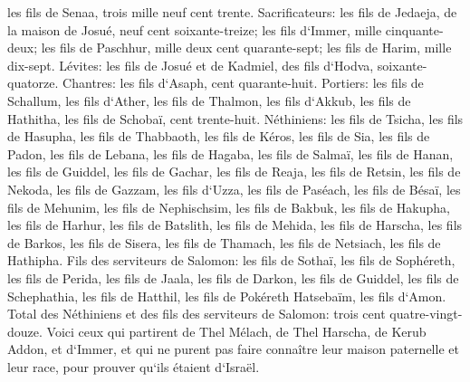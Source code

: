 \verse les fils de Senaa, trois mille neuf cent trente. 
\verse Sacrificateurs: les fils de Jedaeja, de la maison de Josué, neuf cent soixante-treize; 
\verse les fils d`Immer, mille cinquante-deux; 
\verse les fils de Paschhur, mille deux cent quarante-sept; 
\verse les fils de Harim, mille dix-sept. 
\verse Lévites: les fils de Josué et de Kadmiel, des fils d`Hodva, soixante-quatorze. 
\verse Chantres: les fils d`Asaph, cent quarante-huit. 
\verse Portiers: les fils de Schallum, les fils d`Ather, les fils de Thalmon, les fils d`Akkub, les fils de Hathitha, les fils de Schobaï, cent trente-huit. 
\verse Néthiniens: les fils de Tsicha, les fils de Hasupha, les fils de Thabbaoth, 
\verse les fils de Kéros, les fils de Sia, les fils de Padon, 
\verse les fils de Lebana, les fils de Hagaba, les fils de Salmaï, 
\verse les fils de Hanan, les fils de Guiddel, les fils de Gachar, 
\verse les fils de Reaja, les fils de Retsin, les fils de Nekoda, 
\verse les fils de Gazzam, les fils d`Uzza, les fils de Paséach, 
\verse les fils de Bésaï, les fils de Mehunim, les fils de Nephischsim, 
\verse les fils de Bakbuk, les fils de Hakupha, les fils de Harhur, 
\verse les fils de Batslith, les fils de Mehida, les fils de Harscha, 
\verse les fils de Barkos, les fils de Sisera, les fils de Thamach, 
\verse les fils de Netsiach, les fils de Hathipha. 
\verse Fils des serviteurs de Salomon: les fils de Sothaï, les fils de Sophéreth, les fils de Perida, 
\verse les fils de Jaala, les fils de Darkon, les fils de Guiddel, 
\verse les fils de Schephathia, les fils de Hatthil, les fils de Pokéreth Hatsebaïm, les fils d`Amon. 
\verse Total des Néthiniens et des fils des serviteurs de Salomon: trois cent quatre-vingt-douze. 
\verse Voici ceux qui partirent de Thel Mélach, de Thel Harscha, de Kerub Addon, et d`Immer, et qui ne purent pas faire connaître leur maison paternelle et leur race, pour prouver qu`ils étaient d`Israël. 
